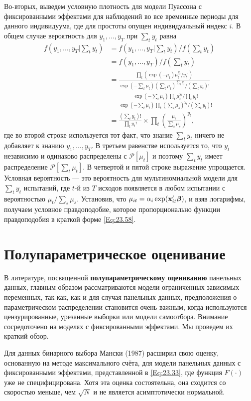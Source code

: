 Во-вторых, выведем условную плотность для модели Пуассона с фиксированными эффектами для наблюдений во все временные периоды для данного индивидуума, где для простоты опущен индивидуальный индекс $i$. В общем случае вероятность для $y_1, \dots, y_T$ при $\sum_t y_t$ равна
\begin{align}
f(y_1, \dots, y_T| \sum_t y_t) 
& = f(y_1, \dots, y_T | \sum_t y_t)/f(\sum_t y_t) \nonumber \\
& = f(y_1, \dots, y_T )/f(\sum_t y_t) \nonumber \\
& = \frac{\prod_t (\exp (-\mu_t)\mu_t^{y_t}/y_t !)}{\exp (-\sum_t \mu_t) (\sum_t \mu_t)^{\sum_t y_t}/(\sum_t y_t)!} \nonumber \\
& = \frac{\exp (-\sum_t \mu_t)\prod_t \mu_t^{y_t}/\prod_t y_t !}{\exp (-\sum_t \mu_t) \prod_t (\sum_s \mu_s)^{y_t}/(\sum_t y_t)!} \nonumber \\
& = \frac{(\sum_t y_t)!}{\prod_t y_t !} \times \prod_t \left( \frac{\mu_t}{\sum_s \mu_s} \right)^{y_t}, \nonumber 
\end{align}
где во второй строке используется тот факт, что знание $\sum_t y_t$ ничего не добавляет к знанию $y_1, \dots, y_T$. В  третьем равенстве используется то, что $y_t$ независимо и одинаково распределены с $\mathcal{P}[\mu_t]$ и поэтому $\sum_t y_t$ имеет распределение $\mathcal{P}[\sum_t \mu_t]$. В четвертой и пятой строке выражение упрощается. Условная вероятность --- это вероятность для мультиномиальной модели для $\sum_t y_t$ испытаний, где $t$-й из $T$ исходов появляется в любом испытании с вероятностью $\mu_t / \sum_s \mu_s$. Установив, что $\mu_{it}=\alpha_i \exp (\mathbf{x}'_{it}\bm{\beta})$, и взяв логарифмы, получаем условное правдоподобие, которое пропорционально функции правдоподобия в краткой форме \ref{Eq:23.58}.

\section{Полупараметрическое оценивание}

В литературе, посвященной \textbf{полупараметрическому оцениванию} панельных данных, главным образом рассматриваются модели ограниченных зависимых переменных, так как, как и для случая панельных данных, предположения о параметрическом распределении становится очень важным, когда используются цензурированные, урезанные выборки или модели самоотбора. Внимание сосредоточено на моделях с фиксированными эффектами. Мы проведем их краткий обзор.

Для данных бинарного выбора Мански (1987) расширил свою оценку, основанную на методе максимального счёта, для модели панельных данных с фиксированными эффектами, представленной в \ref{Eq:23.33}, где функция $F(\cdot)$ уже не специфицирована. Хотя эта оценка состоятельна, она сходится со скоростью меньше, чем $\sqrt{N}$ и не является асимптотически нормальной. 


